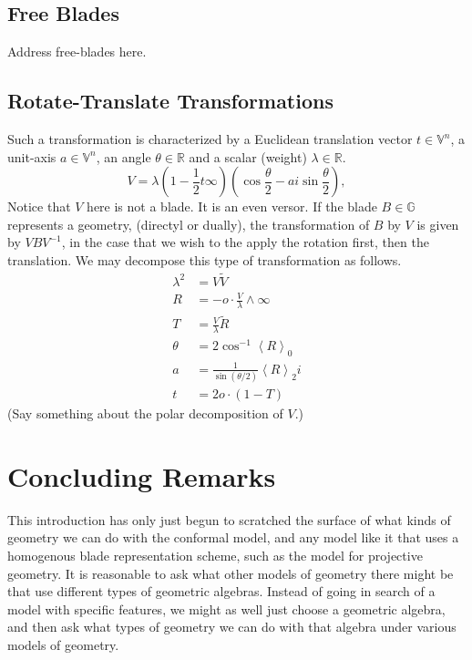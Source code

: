 \documentclass[12pt]{article}
\newcommand{\G}{\mathbb{G}}
\newcommand{\V}{\mathbb{V}}
\newcommand{\R}{\mathbb{R}}
\newcommand{\nvao}{o}
\newcommand{\nvai}{\infty}
\begin{document}
\subsection{Free Blades}

Address free-blades here.

\subsection{Rotate-Translate Transformations}

Such a transformation is characterized by a Euclidean translation vector $t\in\V^n$, a unit-axis $a\in\V^n$,
an angle $\theta\in\R$ and a scalar (weight) $\lambda\in\R$.
\begin{equation*}
V = \lambda\left(1-\frac{1}{2}t\nvai\right)\left(\cos\frac{\theta}{2}-ai\sin\frac{\theta}{2}\right),
\end{equation*}
Notice that $V$ here is not a blade.  It is an even versor.  If the blade $B\in\G$ represents
a geometry, (directyl or dually), the transformation of $B$ by $V$ is given by $VBV^{-1}$,
in the case that we wish to the apply the rotation first, then the translation.
We may decompose this type of transformation as follows.
\begin{align*}
\lambda^2 &= V\tilde{V} \\
R &= -\nvao\cdot\frac{V}{\lambda}\wedge\nvai \\
T &= \frac{V}{\lambda}\tilde{R} \\
\theta &= 2\cos^{-1}\left\langle R\right\rangle_0 \\
a &= \frac{1}{\sin(\theta/2)}\left\langle R\right\rangle_2 i \\
t &= 2\nvao\cdot(1-T)
\end{align*}
(Say something about the polar decomposition of $V$.)

\section{Concluding Remarks}

This introduction has only just begun to scratched the surface of
what kinds of geometry we can do with the conformal model, and
any model like it that uses a homogenous blade representation scheme,
such as the model for projective geometry.  It is reasonable to ask
what other models of geometry there might be that use different
types of geometric algebras.  Instead of going in search of a model
with specific features, we might as well just choose a geometric algebra,
and then ask what types of geometry we can do with that algebra under
various models of geometry.



\end{document}
